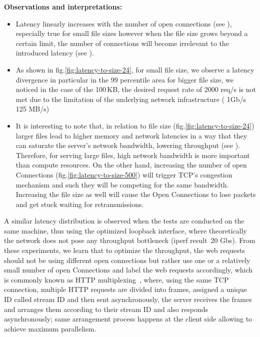 \documentclass[runningheads]{llncs}
\begin{document}
\textbf{Observations and interpretations:}
\begin{itemize}
  \item Latency linearly increases with the number of open connections (see ), especially true for small file sizes however when the file size grows beyond a certain limit, the number of connections will become irrelevant to the introduced latency (see ).
  \item As shown in fig.\ref{fig:latency-to-size-24}, for small file size, we observe a latency divergence in particular in the 99 percentile area
for bigger file size, we noticed in the case of the 100\,KB, the desired request rate of 2000 req/s is not met due to the limitation of the underlying network infrastructure ( 1Gb/s ~ 125 MB/s)
  \item It is interesting to note that, in relation to file size (fig.\ref{fig:latency-to-size-24}) larger files lead to higher memory and network latencies in a way that they can saturate the server’s network bandwidth, lowering throughput (see ). Therefore,  for  serving  large files,  high  network  bandwidth  is  more  important  than compute resources. On the other hand, increasing the number of open Connections (fig.\ref{fig:latency-to-size-500}) will trigger TCP's congestion mechanism and such they will be competing for the same bandwidth. Increasing the file size as well will cause the Open Connections to lose packets and get stuck waiting for retransmissions.
\end{itemize}
A similar latency distribution is observed when the tests are conducted on the same machine, thus using the optimized\cite{linuxkernelcommit} loopback interface, where theoretically the network does not pose any throughput bottleneck (iperf \cite{iperf} result~20 Gbs).
From these experiments, we learn that to optimize the throughput, the web requests should not be using different open connections but rather use one or a relatively small number of open Connections and label the web requests accordingly, which is commonly known as HTTP multiplexing \,\cite{SMUX}, where, using the same TCP connection, multiple HTTP requests are divided into frames, assigned a unique ID called stream ID and then sent asynchronously, the server receives the frames and arranges them according to their stream ID and also responds asynchronously; same arrangement process happens at the client side allowing to achieve maximum parallelism.
\end{document}
